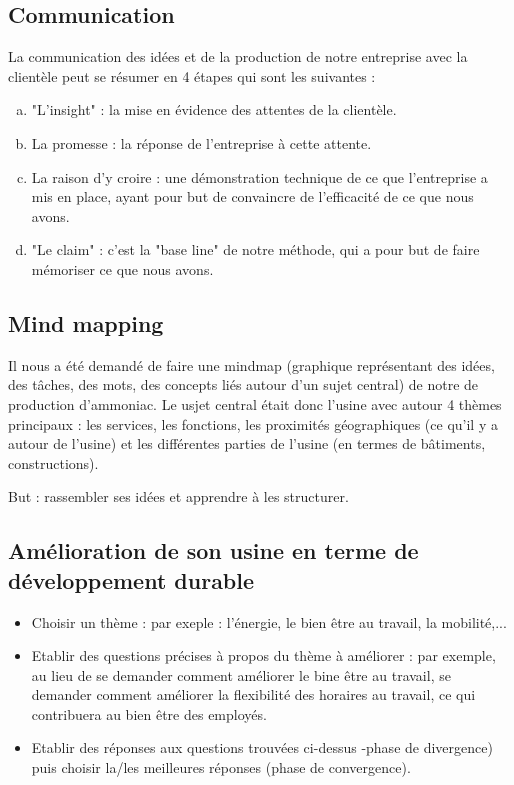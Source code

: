 \subsection{Communication}
La communication des idées et de la production de notre entreprise avec la clientèle peut se résumer en 4 étapes qui sont les suivantes :
\begin{enumerate}[(a)]
\item "L'insight" : la mise en évidence des attentes de la clientèle.
\item La promesse : la réponse de l'entreprise à cette attente.
\item La raison d'y croire : une démonstration technique de ce que l'entreprise a mis en place, ayant pour but de convaincre de l'efficacité de ce que nous avons.
\item "Le claim" : c'est la "base line" de notre méthode, qui a pour but de faire mémoriser ce que nous avons.
\end{enumerate}
\subsection{Mind mapping}
Il nous a été demandé de faire une mindmap (graphique représentant des idées, des tâches, des mots, des concepts liés autour d'un sujet central) de notre de production d'ammoniac.
Le usjet central était donc l'usine avec autour 4 thèmes principaux : les services, les fonctions, les proximités géographiques (ce qu'il y a autour de l'usine) et les différentes parties de l'usine (en termes de bâtiments, constructions).

But : rassembler ses idées et apprendre à les structurer.
\subsection{Amélioration de son usine en terme de développement durable}
\begin{itemize}
\item Choisir un thème : par exeple : l'énergie, le bien être au travail, la mobilité,...
\item Etablir des questions précises à propos du thème à améliorer : par exemple, au lieu de se demander comment améliorer le bine être au travail, se demander comment améliorer la flexibilité des horaires au travail, ce qui contribuera au bien être des employés.
\item Etablir des réponses aux questions trouvées ci-dessus -phase de divergence) puis choisir la/les meilleures réponses (phase de convergence).
\end{itemize}

